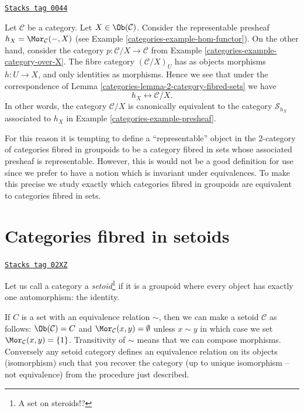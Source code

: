 \begin{example}
\label{categories-example-fibred-category-from-functor-of-points}
\href{https://stacks.math.columbia.edu/tag/0044}{\texttt{Stacks tag 0044}}

Let $\mathcal{C}$ be a category. Let $X \in \Ob(\mathcal{C})$.
Consider the representable presheaf $h_X = \Mor_\mathcal{C}(-, X)$
(see Example \ref{categories-example-hom-functor}).
On the other hand, consider the category $p : \mathcal{C}/X \to \mathcal{C}$
from Example \ref{categories-example-category-over-X}.
The fibre category $(\mathcal{C}/X)_U$ has as objects morphisms
$h : U \to X$, and only identities as morphisms. Hence we see that
under the correspondence of
Lemma \ref{categories-lemma-2-category-fibred-sets}
we have
$$
h_X \longleftrightarrow \mathcal{C}/X.
$$
In other words, the category $\mathcal{C}/X$ is canonically equivalent
to the category $\mathcal{S}_{h_X}$ associated
to $h_X$ in
Example \ref{categories-example-presheaf}.
\end{example}

For this reason it is tempting to define a ``representable'' object in the
2-category of categories fibred in groupoids to be a category fibred in
sets whose associated presheaf is representable. However, this is would not
be a good definition for use since we prefer to have a notion which is
invariant under equivalences. To make this precise we study exactly
which categories fibred in groupoids are equivalent to categories
fibred in sets.

\section{Categories fibred in setoids}
\label{categories-section-fibred-in-setoids}
\begin{definition}[Setoid]
\label{categories-definition-setoid}
\href{https://stacks.math.columbia.edu/tag/02XZ}{\texttt{Stacks tag 02XZ}}

Let us call a category a {\it setoid}\footnote{A set on steroids!?}
if it is a groupoid where every object
has exactly one automorphism: the identity.
\end{definition}

If $C$ is a set with an equivalence relation $\sim$, then we can make a setoid
$\mathcal{C}$ as follows: $\Ob(\mathcal{C}) = C$ and
$\Mor_\mathcal{C}(x, y) = \emptyset$ unless $x \sim y$ in which
case we set $\Mor_\mathcal{C}(x, y) = \{1\}$. Transitivity of
$\sim$ means that we can compose morphisms. Conversely any setoid
category defines an equivalence relation on its objects (isomorphism)
such that you recover the category (up to unique isomorphism -- not
equivalence) from the procedure just described.


